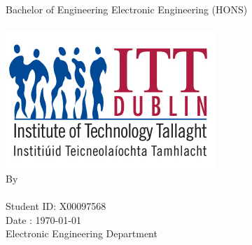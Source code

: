 \begin{titlepage}
	\begin{center}	
		\makeatletter 
		\vspace*{1cm}
		{\LARGE Bachelor of Engineering Electronic Engineering (HONS)}\\[2.5cm]  
		{\huge \textbf{\@title}}\\[3cm] 
		\includegraphics [scale =2]{../Photo/itt-logo} \\[3cm]   
		{\large By} \\[1.5cm] 
		{\LARGE \@author}\\[1cm] 
		 Student ID: X00097568\\[1.5cm]  		 
		Date : \today \\[1.5cm]
	    Electronic Engineering Department \\
	\end{center}
\end{titlepage}




 
